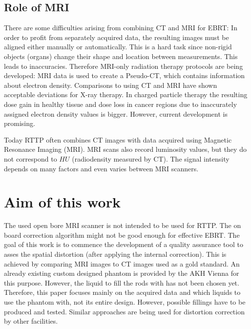 \subsection{Role of MRI}
There are some difficulties arising from combining CT and MRI for EBRT:
In order to profit from separately acquired data, the resulting images must be aligned either manually or automatically. This is a hard task since non-rigid objects (organs) change their shape and location between measurements. This leads to inaccuracies.
Therefore MRI-only radiation therapy protocols are being developed:
MRI data is used to create a Pseudo-CT, which contains information about electron density. Comparisons to using CT and MRI have shown acceptable deviations for X-ray therapy.
In charged particle therapy the resulting dose gain in healthy tissue and dose loss in cancer regions due to inaccurately assigned electron density values is bigger.
However, current development is promising. \cite{Rank2013, Stanescu2006, Nyholm2015, Greer2015, Chen2004}


Today RTTP often combines CT images with data acquired using Magnetic Resonance Imaging (MRI).
MRI scans also record luminosity values, but they do not correspond to $HU$ (radiodensity measured by CT).
The signal intensity depends on many factors and even varies between MRI scanners.



\section{Aim of this work}
The used open bore MRI scanner is not intended to be used for RTTP. The on board correction algorithm might not be good enough for effective EBRT.
The goal of this work is to commence the development of a quality assurance tool to asses the spatial distortion (after applying the internal correction).
This is achieved by comparing MRI images to CT images used as a gold standard.
An already existing custom designed phantom is provided by the AKH Vienna for this purpose.
However, the liquid to fill the rods with has not been chosen yet.
Therefore, this paper focuses mainly on the acquired data and which liquids to use the phantom with, not its entire design.
However, possible fillings have to be produced and tested.
Similar approaches are being used for distortion correction by other facilities. \cite{Price2015, Petersch2004, Torfeh2015, Wang2004, Wang2004b, Mizowaki2000}




\newpage